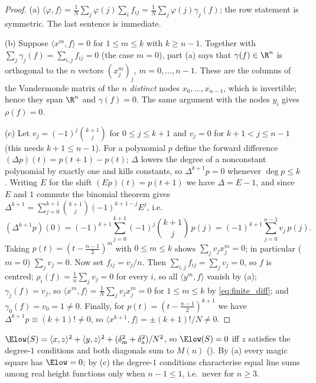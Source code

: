\begin{proof}
(a) $\langle\varphi,f\rangle=\frac1N\sum_j\varphi(j)\sum_i f_{ij}=\frac1N\sum_j\varphi(j)\gamma_j(f)$; the row statement is symmetric.
The last sentence is immediate.

(b) Suppose $\langle x^{m},f\rangle=0$ for $1\le m\le k$ with $k\ge n-1$.  Together with
$\sum_j\gamma_j(f)=\sum_{i,j}f_{ij}=0$ (the case $m=0$), part (a) says that $\gamma(f)\in\R^{n}$ is orthogonal to the
$n$ vectors $(x_j^{m})_{j}$, $m=0,\dots,n-1$.  These are the columns of the Vandermonde matrix of the $n$
\emph{distinct} nodes $x_0,\dots,x_{n-1}$, which is invertible; hence they span $\R^{n}$ and $\gamma(f)=0$.
The same argument with the nodes $y_i$ gives $\rho(f)=0$.

(c) Let $v_j=(-1)^{j}\binom{k+1}{j}$ for $0\le j\le k+1$ and $v_j=0$ for $k+1<j\le n-1$ (this needs
$k+1\le n-1$).  For a polynomial $p$ define the forward difference $(\Delta p)(t)=p(t+1)-p(t)$; $\Delta$
lowers the degree of a nonconstant polynomial by exactly one and kills constants, so $\Delta^{k+1}p=0$ whenever
$\deg p\le k$.  Writing $E$ for the shift $(Ep)(t)=p(t+1)$ we have $\Delta=E-1$, and since $E$ and $1$ commute
the binomial theorem gives $\Delta^{k+1}=\sum_{j=0}^{k+1}\binom{k+1}{j}(-1)^{k+1-j}E^{j}$, i.e.
\begin{equation}
(\Delta^{k+1}p)(0)=(-1)^{k+1}\sum_{j=0}^{k+1}(-1)^{j}\binom{k+1}{j}\,p(j)=(-1)^{k+1}\sum_{j=0}^{n-1}v_j\,p(j).
\label{eq:finite_diff}
\end{equation}
Taking $p(t)=(t-\frac{n-1}2)^{m}$ with $0\le m\le k$ shows $\sum_j v_jx_j^{m}=0$; in particular ($m=0$)
$\sum_jv_j=0$.  Now set $f_{ij}=v_j/n$.  Then $\sum_{i,j}f_{ij}=\sum_jv_j=0$, so $f$ is centred;
$\rho_i(f)=\frac1n\sum_jv_j=0$ for every $i$, so all $\langle y^{m},f\rangle$ vanish by (a);
$\gamma_j(f)=v_j$, so $\langle x^{m},f\rangle=\frac1N\sum_jv_jx_j^{m}=0$ for $1\le m\le k$ by \eqref{eq:finite_diff};
and $\gamma_0(f)=v_0=1\ne0$.  Finally, for $p(t)=(t-\frac{n-1}2)^{k+1}$ we have $\Delta^{k+1}p\equiv(k+1)!\ne0$,
so $\langle x^{k+1},f\rangle=\pm(k+1)!/N\ne0$.
\end{proof}

\begin{corollary}
\label{cor:Elow_degree1}
$\Elow(S)=\langle x,z\rangle^{2}+\langle y,z\rangle^{2}+(\delta_{\mathrm m}^{2}+\delta_{\mathrm a}^{2})/N^{2}$, so
$\Elow(S)=0$ iff $z$ satisfies the degree-$1$ conditions and both diagonals sum to $M(n)$ ().
By (a) every magic square has $\Elow=0$; by (c) the degree-$1$ conditions
characterise equal line sums among real height functions only when $n-1\le1$, i.e.\ never for $n\ge3$.
\end{corollary}

